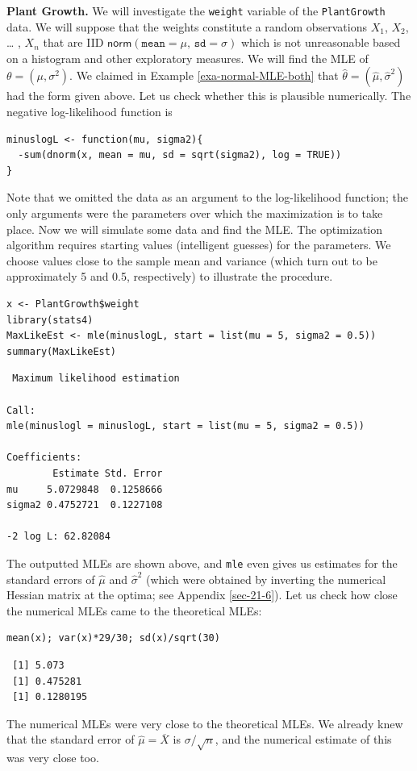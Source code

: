 \documentclass[captions=tableheading]{scrbook}
\begin{document}
\begin{example}

\textbf{Plant Growth.} We will investigate the \texttt{weight} variable of the \texttt{PlantGrowth} data. We will suppose that the weights constitute a random observations \(X_{1}\), \(X_{2}\), \ldots{} , \(X_{n}\) that are IID \(\mathsf{norm}(\mathtt{mean}=\mu,\,\mathtt{sd}=\sigma)\) which is not unreasonable based on a histogram and other exploratory measures. We will find the MLE of \(\theta=(\mu,\sigma^{2})\). We claimed in Example \ref{exa-normal-MLE-both} that \(\hat{\theta}=(\hat{\mu},\hat{\sigma}^{2})\) had the form given above. Let us check whether this is plausible numerically. The negative log-likelihood function is


\begin{verbatim}
minuslogL <- function(mu, sigma2){
  -sum(dnorm(x, mean = mu, sd = sqrt(sigma2), log = TRUE))
}
\end{verbatim}

Note that we omitted the data as an argument to the log-likelihood function; the only arguments were the parameters over which the maximization is to take place. Now we will simulate some data and find the MLE. The optimization algorithm requires starting values (intelligent guesses) for the parameters. We choose values close to the sample mean and variance (which turn out to be approximately 5 and 0.5, respectively) to illustrate the procedure.


\begin{verbatim}
x <- PlantGrowth$weight
library(stats4)
MaxLikeEst <- mle(minuslogL, start = list(mu = 5, sigma2 = 0.5))
summary(MaxLikeEst)
\end{verbatim}


\begin{verbatim}
 Maximum likelihood estimation

Call:
mle(minuslogl = minuslogL, start = list(mu = 5, sigma2 = 0.5))

Coefficients:
        Estimate Std. Error
mu     5.0729848  0.1258666
sigma2 0.4752721  0.1227108

-2 log L: 62.82084
\end{verbatim}

The outputted MLEs are shown above, and \texttt{mle} even gives us estimates for the standard errors of \(\hat{\mu}\) and \(\hat{\sigma}^{2}\) (which were obtained by inverting the numerical Hessian matrix at the optima; see Appendix \ref{sec-21-6}). Let us check how close the numerical MLEs came to the theoretical MLEs:


\begin{verbatim}
mean(x); var(x)*29/30; sd(x)/sqrt(30)
\end{verbatim}

\begin{verbatim}
 [1] 5.073
 [1] 0.475281
 [1] 0.1280195
\end{verbatim}

The numerical MLEs were very close to the theoretical MLEs. We already knew that the standard error of \(\hat{\mu}=\overline{X}\) is \(\sigma/\sqrt{n}\), and the numerical estimate of this was very close too.

\end{example}
\end{document}
